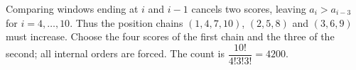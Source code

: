 Comparing windows ending at $i$ and $i-1$ cancels two scores, leaving $a_i>a_{i-3}$ for $i=4,\ldots,10$. Thus the position chains $(1,4,7,10)$, $(2,5,8)$ and $(3,6,9)$ must increase. Choose the four scores of the first chain and the three of the second; all internal orders are forced. The count is $\dfrac{10!}{4!3!3!}=\boxed{4200}$.
